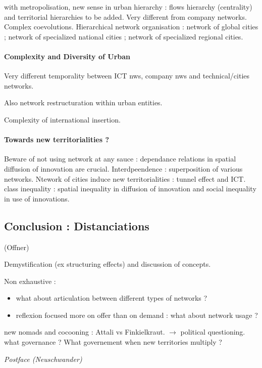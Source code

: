 with metropolisation, new sense in urban hierarchy : flows hierarchy (centrality) and territorial hierarchies to be added. Very different from company networks. Complex coevolutions. Hierarchical network organisation : network of global cities ; network of specialized national cities ; network of specialized regional cities.

\paragraph{Complexity and Diversity of Urban}

Very different temporality between ICT nws, company nws and technical/cities networks.

Also network restructuration within urban entities.

Complexity of international insertion.

\paragraph{Towards new territorialities ?}

Beware of not using network at any sauce : dependance relations in spatial diffusion of innovation are crucial. Interdpeendence : superposition of various networks. Ntework of cities induce new territorialities : tunnel effect and ICT. class inequality : spatial inequality in diffusion of innovation and social inequality in use of innovations.


\subsection{Conclusion : Distanciations}

(Offner)

Demystification (ex structuring effects) and discussion of concepts.

Non exhaustive : 
\begin{itemize}
\item what about articulation between different types of networks ?
\item reflexion focused more on offer than on demand : what about network usage ?
\end{itemize}

new nomads and cocooning : Attali vs Finkielkraut. $\rightarrow$ political questioning. what governance ? What governement when new territories multiply ?


\textit{Postface (Neuschwander)}

